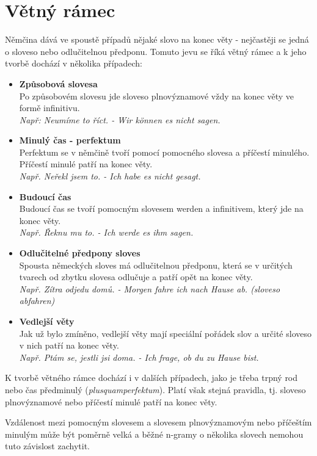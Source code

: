 \documentclass[12pt,a4paper]{report}
\begin{document}
\section{Větný rámec}
Němčina dává ve spoustě případů nějaké slovo na konec věty - nejčastěji se jedná o sloveso nebo odlučitelnou předponu. Tomuto jevu se říká větný rámec a k jeho tvorbě dochází v několika případech:
\begin{itemize}
\item
\textbf{Způsobová slovesa}\\
Po způsobovém slovesu jde sloveso plnovýznamové vždy na konec věty ve formě infinitivu. \\
\textit{Např: Neumíme to říct. - Wir können es nicht sagen.}
\item
\textbf{Minulý čas - perfektum}\\
Perfektum se v němčině tvoří pomocí pomocného slovesa a příčestí minulého. Příčestí minulé patří na konec věty.\\
\textit{Např. Neřekl jsem to. - Ich habe es nicht gesagt.}
\item
\textbf{Budoucí čas} \\
Budoucí čas se tvoří pomocným slovesem werden a infinitivem, který jde na konec věty.\\
\textit{Např. Řeknu mu to. - Ich werde es ihm sagen.}
\item
\textbf{Odlučitelné předpony sloves}\\
Spousta německých sloves má odlučitelnou předponu, která se v určitých tvarech od zbytku slovesa odlučuje a patří opět na konec věty.\\
\textit{Např. Zítra odjedu domů. - Morgen fahre ich nach Hause ab. (sloveso abfahren)}
\item
\textbf{Vedlejší věty}\\
Jak už bylo zmíněno, vedlejší věty mají speciální pořádek slov a určité sloveso v nich patří na konec věty.\\
\textit{Např. Ptám se, jestli jsi doma. - Ich frage, ob du zu Hause bist.}
\end{itemize}

K tvorbě větného rámce dochází i v dalších případech, jako je třeba trpný rod nebo čas předminulý (\textit{plusquamperfektum}). Platí však stejná pravidla, tj. sloveso plnovýznamové nebo příčestí minulé patří na konec věty.

Vzdálenost mezi pomocným slovesem a slovesem plnovýznamovým nebo příčeštím minulým může být poměrně velká a běžné n-gramy o několika slovech nemohou tuto závislost zachytit.
\end{document}
